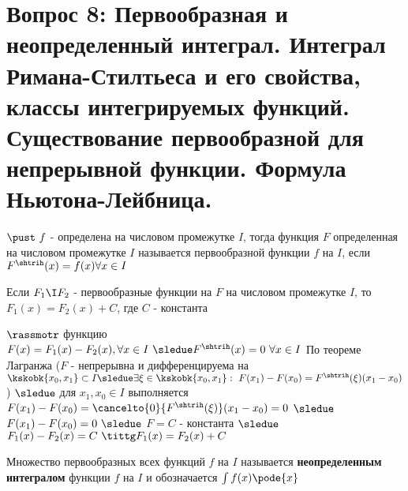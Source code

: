 \section{Вопрос 8: Первообразная и неопределенный интеграл. Интеграл Римана-Стилтьеса и его свойства, классы интегрируемых функций. Существование первообразной для непрерывной функции. Формула Ньютона-Лейбница.}

\begin{defs}
	$\pust \ f$ - определена на числовом промежутке $I$, тогда функция $F$ определенная на числовом промежутке $I$ называется первообразной функции $f$ на $I$, если $F^{\shtrih}(x)=f(x) \forall x \in I$
\end{defs}

\begin{proofs}
	Если $F_1 \I F_2$ - первообразные функции на $F$ на числовом промежутке $I$, то $F_1(x) = F_2(x) + C$, где $C$ - константа
	\begin{dokvo}
		$\rassmotr$ функцию $F(x)=F_1(x) - F_2(x), \forall x \in I \ \sledue F^{\shtrih}(x)=0 \ \forall x \in I$
		По теореме Лагранжа ($F$ - непрерывна и дифференцируема на $\kskobk{x_0, x_1} \subset I \sledue \exists \xi \in \kskobk{x_0,x_1}: \ F(x_1)-F(x_0)=F^{\shtrih}(\xi)(x_1 - x_0)$) $\sledue$ для $x_1, x_0 \in I$ выполняется $F(x_1)- F(x_0) = \cancelto{0}{F^{\shtrih}(\xi)}(x_1-x_0) = 0$  $\sledue$ $F(x_1) - F(x_0) = 0 \ \sledue$ $F = C$ - константа $\sledue$ $F_1(x) - F_2(x) = C \ \tittg F_1(x) = F_2(x) + C$
	\end{dokvo}
\end{proofs}

\begin{defs}
	Множество первообразных всех функций $f$ на $I$ называется \textbf{неопределенным интегралом} функции $f$ на $I$ и обозначается $\int f(x) \pode{x}$
\end{defs}

